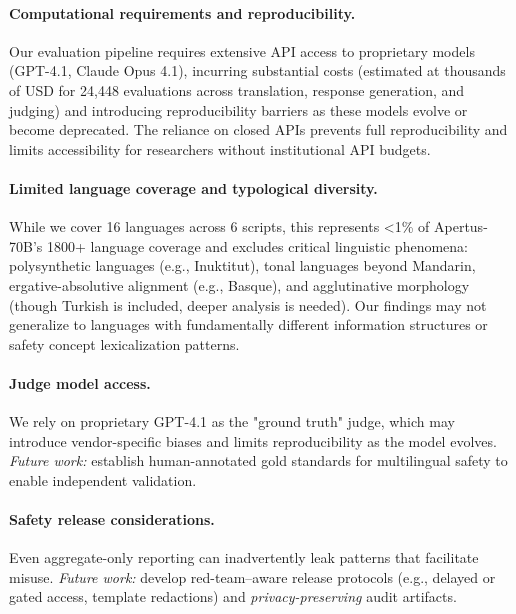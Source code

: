 \paragraph{Computational requirements and reproducibility.}
Our evaluation pipeline requires extensive API access to proprietary models (GPT-4.1, Claude Opus 4.1), incurring substantial costs (estimated at thousands of USD for 24,448 evaluations across translation, response generation, and judging) and introducing reproducibility barriers as these models evolve or become deprecated. The reliance on closed APIs prevents full reproducibility and limits accessibility for researchers without institutional API budgets.

\paragraph{Limited language coverage and typological diversity.}
While we cover 16 languages across 6 scripts, this represents <1\% of Apertus-70B's 1800+ language coverage and excludes critical linguistic phenomena: polysynthetic languages (e.g., Inuktitut), tonal languages beyond Mandarin, ergative-absolutive alignment (e.g., Basque), and agglutinative morphology (though Turkish is included, deeper analysis is needed). Our findings may not generalize to languages with fundamentally different information structures or safety concept lexicalization patterns.

\paragraph{Judge model access.}
We rely on proprietary GPT-4.1 as the "ground truth" judge, which may introduce vendor-specific biases and limits reproducibility as the model evolves. \emph{Future work:} establish human-annotated gold standards for multilingual safety to enable independent validation.

\paragraph{Safety release considerations.}
Even aggregate-only reporting can inadvertently leak patterns that facilitate misuse. \emph{Future work:} develop red-team--aware release protocols (e.g., delayed or gated access, template redactions) and \emph{privacy-preserving} audit artifacts.

